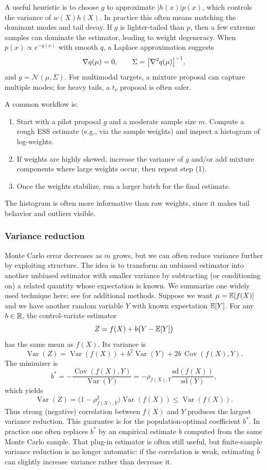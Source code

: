 A useful heuristic is to choose $g$ to approximate $|h(x)|p(x)$, which controls the variance of $w(X)h(X)$.
In practice this often means matching the dominant modes and tail decay.
If $g$ is lighter-tailed than $p$, then a few extreme samples can dominate the estimator, leading to weight degeneracy.
When $p(x) \propto e^{-q(x)}$ with smooth $q$, a Laplace approximation suggests
\[
\nabla q(\mu) = 0, \qquad \Sigma = \bigl[\nabla^2 q(\mu)\bigr]^{-1},
\]
and $g = \mathcal{N}(\mu,\Sigma)$.
For multimodal targets, a mixture proposal can capture multiple modes; for heavy tails, a $t_\nu$ proposal is often safer.

A common workflow is:
\begin{enumerate}[leftmargin=*,label=(\arabic*)]
  \item Start with a pilot proposal $g$ and a moderate sample size $m$.
  Compute a rough ESS estimate (e.g., via the sample weights) and inspect a histogram of log-weights.
  \item If weights are highly skewed, increase the variance of $g$ and/or add mixture components where large weights occur, then repeat step (1).
  \item Once the weights stabilize, run a larger batch for the final estimate.
\end{enumerate}
The histogram is often more informative than raw weights, since it makes tail behavior and outliers visible.

\subsubsection{Variance reduction}
Monte Carlo error decreases as $m$ grows, but we can often reduce variance further by exploiting structure.
The idea is to transform an unbiased estimator into another unbiased estimator with smaller variance by subtracting (or conditioning on) a related quantity whose expectation is known.
We summarize one widely used technique here; see \citet[\S2.3]{liu_2002_monte_carlo} for additional methods.
Suppose we want $\mu = \mathbb{E}[f(X)]$ and we have another random variable $Y$ with known expectation $\mathbb{E}[Y]$.
For any $b \in \mathbb{R}$, the control-variate estimator
\[
Z = f(X) + b\bigl(Y - \mathbb{E}[Y]\bigr)
\]
has the same mean as $f(X)$.
Its variance is
\[
\operatorname{Var}(Z) = \operatorname{Var}(f(X)) + b^2 \operatorname{Var}(Y) + 2b\,\operatorname{Cov}(f(X),Y).
\]
The minimizer is
\[
 b^* = -\frac{\operatorname{Cov}(f(X),Y)}{\operatorname{Var}(Y)} = -\rho_{f(X),Y}\frac{\mathrm{sd}(f(X))}{\mathrm{sd}(Y)},
\]
which yields
\[
\operatorname{Var}(Z) = \bigl(1-\rho_{f(X),Y}^2\bigr)\operatorname{Var}(f(X)) \le \operatorname{Var}(f(X)).
\]
Thus strong (negative) correlation between $f(X)$ and $Y$ produces the largest variance reduction.
This guarantee is for the population-optimal coefficient \(b^*\).
In practice one often replaces \(b^*\) by an empirical estimate \(\hat b\) computed from the same Monte Carlo sample.
That plug-in estimator is often still useful, but finite-sample variance reduction is no longer automatic: if the correlation is weak, estimating \(\hat b\) can slightly increase variance rather than decrease it.

